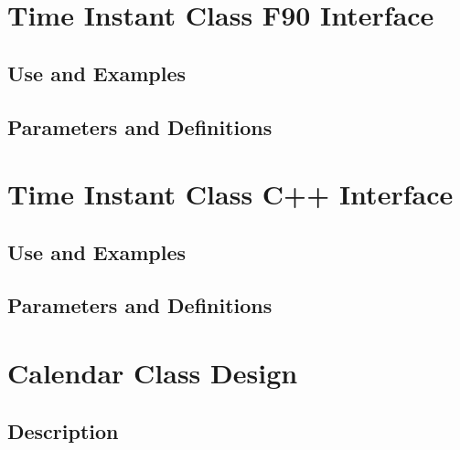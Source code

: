 \documentclass[]{article}
\begin{document}
\section{Time Instant Class F90 Interface}

\subsection{Use and Examples}


\subsection{Parameters and Definitions}
%



\section{Time Instant Class C++ Interface}

\subsection{Use and Examples}
%

\subsection{Parameters and Definitions}
%




\section{Calendar Class Design}

\subsection{Description}

\end{document}
